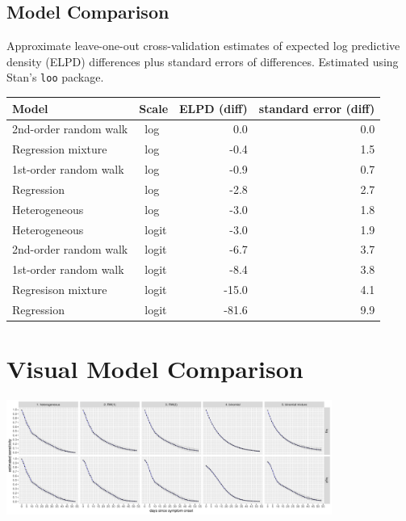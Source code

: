 \documentclass[plainboxedsections, 25pt]{sciposter}
\begin{document}
\begin{multicols}{2}
\section{Model Comparison}

Approximate leave-one-out cross-validation estimates of expected log
predictive density (ELPD) differences plus standard
errors of differences.  Estimated using Stan's \texttt{loo} package.
\vspace*{12pt}
\begin{center}
\begin{tabular}{ll|rr}
\hline
Model & Scale & ELPD (diff) & standard error (diff)
\\ \hline
2nd-order random walk & \ log &  0.0 & 0.0
\\
Regression mixture & \ log &   -0.4 &      1.5  
\\
1st-order random walk & \ log        &         -0.9 &       0.7  
\\
Regression & \ log &   -2.8  &     2.7  
\\
Heterogeneous & \ log & -3.0     &  1.8  
\\ \hline
Heterogeneous & \ logit &    -3.0    &   1.9  
\\
2nd-order random walk & \ logit  & -6.7     &  3.7  
\\
1st-order random walk & \ logit              & -8.4      & 3.8  
\\
Regresison mixture & \ logit  & -15.0  &     4.1  
\\
Regression & \ logit & -81.6   &    9.9
\\ \hline
\end{tabular}
\end{center}
\end{multicols}
\centering
\vfill
\section{Visual Model Comparison}
\includegraphics[width=0.8\textwidth]{img/model-link-comparison.pdf}
\end{document}
